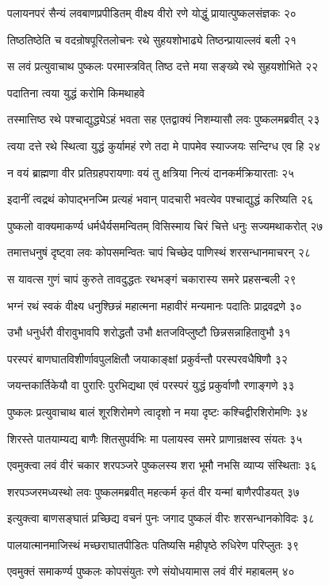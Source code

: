 पलायनपरं सैन्यं लवबाणप्रपीडितम्
वीक्ष्य वीरो रणे योद्धुं प्रायात्पुष्कलसंज्ञकः २०

तिष्ठतिष्ठेति च वदन्रोषपूरितलोचनः
रथे सुहयशोभाढ्ये तिष्ठन्प्रायाल्लवं बली २१

स लवं प्रत्युवाचाथ पुष्कलः परमास्त्रवित्
तिष्ठ दत्ते मया सङ्ख्ये रथे सुहयशोभिते २२

पदातिना त्वया युद्धं करोमि किमथाहवे

तस्मात्तिष्ठ रथे पश्चाद्युद्ध्येऽहं भवता सह
एतद्वाक्यं निशम्यासौ लवः पुष्कलमब्रवीत् २३

त्वया दत्ते रथे स्थित्वा युद्धं कुर्यामहं रणे
तदा मे पापमेव स्याज्जयः सन्दिग्ध एव हि २४

न वयं ब्राह्मणा वीर प्रतिग्रहपरायणाः
वयं तु क्षत्रिया नित्यं दानकर्मक्रियारताः २५

इदानीं त्वद्रथं कोपाद्भनज्मि प्रत्यहं भवान्
पादचारी भवत्येव पश्चाद्युद्धं करिष्यति २६

पुष्कलो वाक्यमाकर्ण्य धर्मधैर्यसमन्वितम्
विसिस्माय चिरं चित्ते धनुः सज्यमथाकरोत् २७

तमात्तधनुषं दृष्ट्वा लवः कोपसमन्वितः
चापं चिच्छेद पाणिस्थं शरसन्धानमाचरन् २८

स यावत्स गुणं चापं कुरुते तावदुद्धतः
रथभङ्गं चकारास्य समरे प्रहसन्बली २९

भग्नं रथं स्वकं वीक्ष्य धनुश्छिन्नं महात्मना
महावीरं मन्यमानः पदातिः प्राद्रवद्रणे ३०

उभौ धनुर्धरौ वीरावुभावपि शरोद्धतौ
उभौ क्षतजविप्लुष्टौ छिन्नसन्नाहितावुभौ ३१

परस्परं बाणघातविशीर्णावपुलक्षितौ
जयाकाङ्क्षां प्रकुर्वन्तौ परस्परवधैषिणौ ३२

जयन्तकार्तिकेयौ वा पुरारिः पुरभिद्यथा
एवं परस्परं युद्धं प्रकुर्वाणौ रणाङ्गणे ३३

पुष्कलः प्रत्युवाचाथ बालं शूरशिरोमणे
त्वादृशो न मया दृष्टः कश्चिद्वीरशिरोमणिः ३४

शिरस्ते पातयाम्यद्य बाणैः शितसुपर्वभिः
मा पलायस्व समरे प्राणान्रक्षस्व संयतः ३५

एवमुक्त्वा लवं वीरं चकार शरपञ्जरे
पुष्कलस्य शरा भूमौ नभसि व्याप्य संस्थिताः ३६

शरपञ्जरमध्यस्थो लवः पुष्कलमब्रवीत्
महत्कर्म कृतं वीर यन्मां बाणैरपीडयत् ३७

इत्युक्त्वा बाणसङ्घातं प्रच्छिद्य वचनं पुनः
जगाद पुष्कलं वीरः शरसन्धानकोविदः ३८

पालयात्मानमाजिस्थं मच्छराघातपीडितः
पतिष्यसि महीपृष्ठे रुधिरेण परिप्लुतः ३९

एवमुक्तं समाकर्ण्य पुष्कलः कोपसंयुतः
रणे संयोधयामास लवं वीरं महाबलम् ४०

